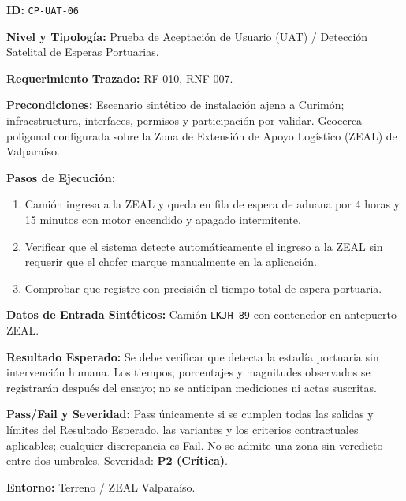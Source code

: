 \par\noindent\textbf{ID:} \texttt{C\allowbreak{}P\allowbreak{}-\allowbreak{}U\allowbreak{}A\allowbreak{}T\allowbreak{}-\allowbreak{}0\allowbreak{}6\allowbreak{}}\par
\par\noindent\textbf{Nivel y Tipología:} Prueba de Aceptación de Usuario (UAT) / Detección Satelital de Esperas Portuarias.\par
\par\noindent\textbf{Requerimiento Trazado:} RF-010, RNF-007.\par
\par\noindent\textbf{Precondiciones:} Escenario sintético de instalación ajena a Curimón; infraestructura, interfaces, permisos y participación por validar.  Geocerca poligonal configurada sobre la Zona de Extensión de Apoyo Logístico (ZEAL) de Valparaíso.\par
\par\noindent\textbf{Pasos de Ejecución:} \par
\begin{enumerate}
\item Camión ingresa a la ZEAL y queda en fila de espera de aduana por 4 horas y 15 minutos con motor encendido y apagado intermitente.
\item Verificar que el sistema detecte automáticamente el ingreso a la ZEAL sin requerir que el chofer marque manualmente en la aplicación.
\item Comprobar que registre con precisión el tiempo total de espera portuaria.
\end{enumerate}
\par\noindent\textbf{Datos de Entrada Sintéticos:} Camión \texttt{L\allowbreak{}K\allowbreak{}J\allowbreak{}H\allowbreak{}-\allowbreak{}8\allowbreak{}9\allowbreak{}} con contenedor en antepuerto ZEAL.\par
\par\noindent\textbf{Resultado Esperado:} Se debe verificar que detecta la estadía portuaria sin intervención humana. Los tiempos, porcentajes y magnitudes observados se registrarán después del ensayo; no se anticipan mediciones ni actas suscritas.\par
\par\noindent\textbf{Pass/Fail y Severidad:} Pass únicamente si se cumplen todas las salidas y límites del Resultado Esperado, las variantes y los criterios contractuales aplicables; cualquier discrepancia es Fail. No se admite una zona sin veredicto entre dos umbrales. Severidad: \textbf{P2 (Crítica)}.\par
\par\noindent\textbf{Entorno:} Terreno / ZEAL Valparaíso.\par






